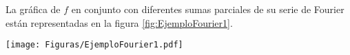 \begin{ejemplo}
La gráfica de $f$ en conjunto con diferentes sumas parciales de su serie de Fourier están representadas en la figura \ref{fig:EjemploFourier1}. 

    \centering
    \texttt{[image: Figuras/EjemploFourier1.pdf]}
    \label{fig:EjemploFourier1}
\end{ejemplo}




